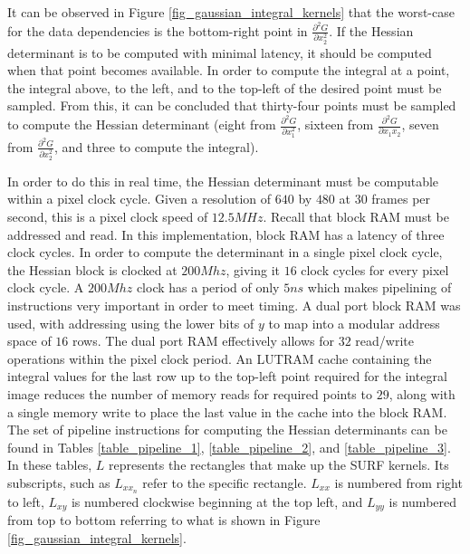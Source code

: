 \documentclass{article}
\begin{document}
It can be observed in Figure \ref{fig_gaussian_integral_kernels} that the worst-case for the data dependencies is the bottom-right point in $\frac{\partial^2 G}{\partial x_2^2}$. If the Hessian determinant is to be computed with minimal latency, it should be computed when that point becomes available. In order to compute the integral at a point, the integral above, to the left, and to the top-left of the desired point must be sampled. From this, it can be concluded that thirty-four points must be sampled to compute the Hessian determinant (eight from $\frac{\partial^2 G}{\partial x_1^2}$, sixteen from $\frac{\partial^2 G}{\partial x_1 x_2}$, seven from $\frac{\partial^2 G}{\partial x_2^2}$, and three to compute the integral). 

In order to do this in real time, the Hessian determinant must be computable within a pixel clock cycle. Given a resolution of $640$ by $480$ at $30$ frames per second, this is a pixel clock speed of $12.5 MHz$. Recall that block RAM must be addressed and read. In this implementation, block RAM has a latency of three clock cycles. In order to compute the determinant in a single pixel clock cycle, the Hessian block is clocked at $200 Mhz$, giving it $16$ clock cycles for every pixel clock cycle. A $200 Mhz$ clock has a period of only $5ns$ which makes pipelining of instructions very important in order to meet timing. A dual port block RAM was used, with addressing using the lower bits of $y$ to map into a modular address space of $16$ rows. The dual port RAM effectively allows for $32$ read/write operations within the pixel clock period. An LUTRAM cache containing the integral values for the last row up to the top-left point required for the integral image reduces the number of memory reads for required points to $29$, along with a single memory write to place the last value in the cache into the block RAM. The set of pipeline instructions for computing the Hessian determinants can be found in Tables \ref{table_pipeline_1}, \ref{table_pipeline_2}, and \ref{table_pipeline_3}. In these tables, $L$ represents the rectangles that make up the SURF kernels. Its subscripts, such as $L_{xx_n}$ refer to the specific rectangle. $L_{xx}$ is numbered from right to left, $L_{xy}$ is numbered clockwise beginning at the top left, and $L_{yy}$ is numbered from top to bottom referring to what is shown in Figure \ref{fig_gaussian_integral_kernels}.
\end{document}

